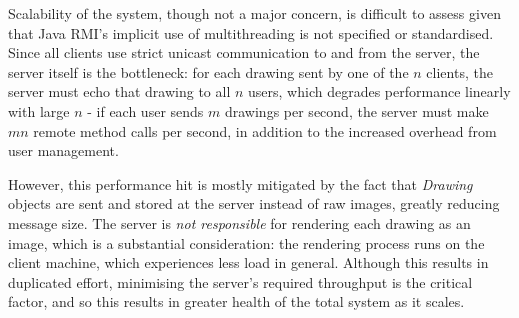 \documentclass[12pt,a4paper]{article}
\begin{document}
Scalability of the system, though not a major concern, is difficult to assess given that Java RMI's implicit use of multithreading is not specified or standardised. Since all clients use strict unicast communication to and from the server, the server itself is the bottleneck: for each drawing sent by one of the $n$ clients, the server must echo that drawing to all $n$ users, which degrades performance linearly with large $n$ - if each user sends $m$ drawings per second, the server must make $mn$ remote method calls per second, in addition to the increased overhead from user management. 

However, this performance hit is mostly mitigated by the fact that \textit{Drawing} objects are sent and stored at the server instead of raw images, greatly reducing message size. The server is \textit{not responsible} for rendering each drawing as an image, which is a substantial consideration: the rendering process runs on the client machine, which experiences less load in general. Although this results in duplicated effort, minimising the server's required throughput is the critical factor, and so this results in greater health of the total system as it scales.
\end{document}
